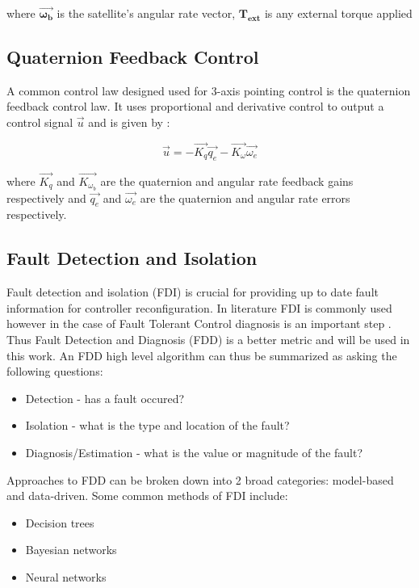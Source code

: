 where $\boldsymbol{\vec{\omega_{b}}}$ is the satellite's angular rate vector, $\boldsymbol{T_{ext}}$ is any external torque applied

\subsection{Quaternion Feedback Control}
A common control law designed used for 3-axis pointing control is the quaternion feedback control law. It uses proportional and derivative control to output a control signal $\vec{u}$ and is given by \cite{wieSpaceVehicleDynamics1998}:

\begin{equation}
    \vec{u} = -\vec{K_{q}}\vec{q_{e}} - \vec{K_{\omega}}\vec{\omega_{e}}
\end{equation}

where $\vec{K_{q}}$ and $\vec{K_{\omega_{b}}}$ are the quaternion and angular rate feedback gains respectively and $\vec{q_{e}}$ and $\vec{\omega_{e}}$ 
are the quaternion and angular rate errors respectively.

\subsection{Fault Detection and Isolation}
Fault detection and isolation (FDI) is crucial for providing up to date fault information for controller reconfiguration. In literature FDI is commonly used however in the case of Fault Tolerant Control diagnosis is an important step \cite{yinReviewRecentDevelopment2016}. Thus Fault Detection and Diagnosis (FDD) is a better metric and will be used in this work. An FDD high level algorithm can thus be summarized as asking the following questions:
\begin{itemize}
    \item Detection - has a fault occured?
    \item Isolation - what is the type and location of the fault?
    \item Diagnosis/Estimation - what is the value or magnitude of the fault?
\end{itemize}

Approaches to FDD can be broken down into 2 broad categories: model-based and data-driven. Some common methods of FDI include:
\begin{itemize}
    \item Decision trees
    \item Bayesian networks
    \item Neural networks
\end{itemize}

